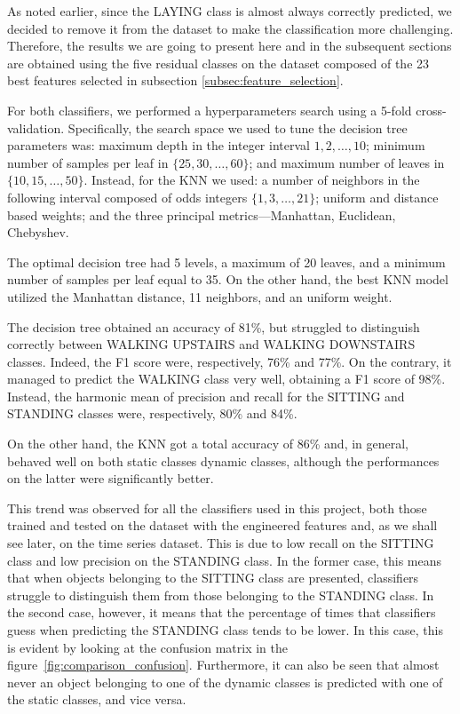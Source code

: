 \documentclass[10pt, a4paper, twocolumn]{article}
\begin{document}
As noted earlier, since the LAYING class is almost always correctly predicted, we decided to remove it from the dataset to make the classification more challenging. Therefore, the results we are going to present here and in the subsequent sections are obtained using the five residual classes on the dataset composed of the 23 best features selected in subsection \ref{subsec:feature_selection}.

For both classifiers, we performed a hyperparameters search using a 5-fold cross-validation. Specifically, the search space we used to tune the decision tree parameters was: maximum depth in the integer interval $1,2,\dots,10$; minimum number of samples per leaf in $\{25, 30,\dots, 60\}$; and maximum number of leaves in $\{10, 15,\dots, 50\}$. Instead, for the KNN we used: a number of neighbors in the following interval composed of odds integers $\{1,3,\dots,21\}$; uniform and distance based weights; and the three principal metrics---Manhattan, Euclidean, Chebyshev.

The optimal decision tree had 5 levels, a maximum of 20 leaves, and a minimum number of samples per leaf equal to 35. On the other hand, the best KNN model utilized the Manhattan distance, 11 neighbors, and an uniform weight.

The decision tree obtained an accuracy of 81\%, but struggled to distinguish correctly between WALKING UPSTAIRS and WALKING DOWNSTAIRS classes. Indeed, the F1 score were, respectively, 76\% and 77\%. On the contrary, it managed to predict the WALKING class very well, obtaining a F1 score of 98\%. Instead, the harmonic mean of precision and recall for the SITTING and STANDING classes were, respectively, 80\% and 84\%.

On the other hand, the KNN got a total accuracy of 86\% and, in general, behaved well on both static classes dynamic classes, although the performances on the latter were significantly better.

This trend was observed for all the classifiers used in this project, both those trained and tested on the dataset with the engineered features and, as we shall see later, on the time series dataset. This is due to low recall on the SITTING class and low precision on the STANDING class. In the former case, this means that when objects belonging to the SITTING class are presented, classifiers struggle to distinguish them from those belonging to the STANDING class. In the second case, however, it means that the percentage of times that classifiers guess when predicting the STANDING class tends to be lower. In this case, this is evident by looking at the confusion matrix in the figure~\ref{fig:comparison_confusion}. Furthermore, it can also be seen that almost never an object belonging to one of the dynamic classes is predicted with one of the static classes, and vice versa.
\end{document}
